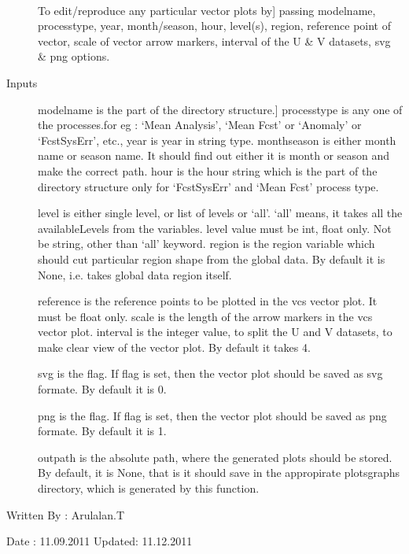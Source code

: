 \documentclass[letterpaper,10pt,english]{sphinxmanual}
\begin{document}
\begin{fulllineitems}
\label{diagnosis:generate_winds_plots.editVectorPlot}~\begin{description}
\item[{{\hyperref[diagnosis:generate_winds_plots.editVectorPlot]{}}}] \leavevmode{[}To edit/reproduce any particular vector plots by{]}
passing modelname, processtype, year, month/season, hour, level(s),
region, reference point of vector, scale of vector arrow markers,
interval of the U \& V datasets, svg \& png options.

\item[{Inputs}] \leavevmode{[}modelname is the part of the directory structure.{]}
processtype is any one of the processes.for eg : `Mean Analysis',
`Mean Fcst' or `Anomaly' or `FcstSysErr', etc.,
year is year in string type.
monthseason is either month name or season name. It should find
out either it is month or season and make the correct path.
hour is the hour string which is the part of the directory
structure only for `FcstSysErr' and `Mean Fcst' process type.

level is either single level, or list of levels or `all'.
`all' means, it takes all the availableLevels from the variables.
level value must be int, float only. Not be string, other than
`all' keyword.
region is the region variable which should cut particular region
shape from the global data. By default it is None, i.e. takes
global data region itself.

reference is the reference points to be plotted in the vcs
vector plot. It must be float only.
scale is the length of the arrow markers in the vcs vector plot.
interval is the integer value, to split the U and V datasets,
to make clear view of the vector plot. By default it takes 4.

svg is the flag. If flag is set, then the vector plot should be
saved as svg formate. By default it is 0.

png is the flag. If flag is set, then the vector plot should be
saved as png formate. By default it is 1.

outpath is the absolute path, where the generated plots should be
stored. By default, it is None, that is it should save in the
appropirate plotsgraphs directory, which is generated by this
function.

\end{description}

Written By : Arulalan.T

Date : 11.09.2011
Updated: 11.12.2011

\end{fulllineitems}
\end{document}
